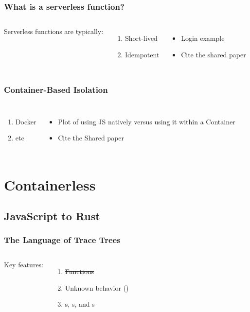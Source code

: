\documentclass{beamer}
\begin{document}
\begin{frame}
\frametitle{What is a serverless function?}
\begin{columns}
Serverless functions are typically:
\begin{enumerate}
    \item Short-lived
    \item Idempotent
\end{enumerate}
\begin{itemize}
  \item Login example
  \item Cite the shared paper
\end{itemize}
\end{columns}
\end{frame}

\begin{frame}
\frametitle{Container-Based Isolation}
\begin{columns}
\begin{enumerate}
    \item Docker
    \item etc
\end{enumerate}
\begin{itemize}
  \item Plot of using JS natively versus using it within a Container
  \item Cite the Shared paper
\end{itemize}
\end{columns}
\end{frame}

\section{Containerless}
\subsection{JavaScript to Rust}

\begin{frame}
\frametitle{The Language of Trace Trees}
\begin{columns}
Key features:
\begin{enumerate}
    \item \sout{Functions}
    \item Unknown behavior (\tUnk)
    \item {}s, s, and s
\end{enumerate}
\begin{figure}
\scalebox{0.4}{}
\end{figure}
\end{columns}
\end{frame}
\end{document}
